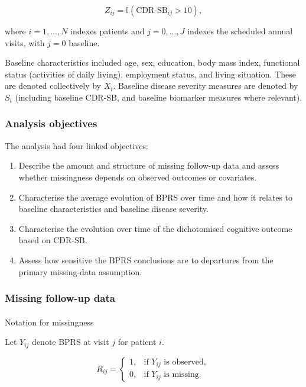 \documentclass[
  9pt,
  letterpaper,
  DIV=11,
  numbers=noendperiod]{scrartcl}
\makeatletter
\let\oldparagraph\paragraph
\renewcommand{\paragraph}{
    \@ifstar
      \xxxParagraphStar
      \xxxParagraphNoStar
  }
\newcommand{\xxxParagraphStar}[1]{\oldparagraph*{#1}\mbox{}}
\newcommand{\xxxParagraphNoStar}[1]{\oldparagraph{#1}\mbox{}}
\providecommand{\tightlist}{%
  \setlength{\itemsep}{0pt}\setlength{\parskip}{0pt}}
\makeatother
\begin{document}
\[
Z_{ij} = \mathbb{I}\!\left(\mathrm{CDR\text{-}SB}_{ij} > 10\right),
\]

where \(i=1,\dots,N\) indexes patients and \(j=0,\dots,J\) indexes the
scheduled annual visits, with \(j=0\) baseline.

Baseline characteristics included age, sex, education, body mass index,
functional status (activities of daily living), employment status, and
living situation. These are denoted collectively by \(X_i\). Baseline
disease severity measures are denoted by \(S_i\) (including baseline
CDR-SB, and baseline biomarker measures where relevant).

\subsubsection{Analysis objectives}\label{analysis-objectives}

The analysis had four linked objectives:

\begin{enumerate}
\def\labelenumi{\arabic{enumi}.}
\tightlist
\item
  Describe the amount and structure of missing follow-up data and assess
  whether missingness depends on observed outcomes or covariates.
\item
  Characterise the average evolution of BPRS over time and how it
  relates to baseline characteristics and baseline disease severity.
\item
  Characterise the evolution over time of the dichotomised cognitive
  outcome based on CDR-SB.
\item
  Assess how sensitive the BPRS conclusions are to departures from the
  primary missing-data assumption.
\end{enumerate}

\subsubsection{Missing follow-up data}\label{missing-follow-up-data}

\paragraph{Notation for missingness}\label{notation-for-missingness}

Let \(Y_{ij}\) denote BPRS at visit \(j\) for patient \(i\).

\[
R_{ij} =
\begin{cases}
1, & \text{if } Y_{ij} \text{ is observed}, \\
0, & \text{if } Y_{ij} \text{ is missing}.
\end{cases}
\]
\end{document}
